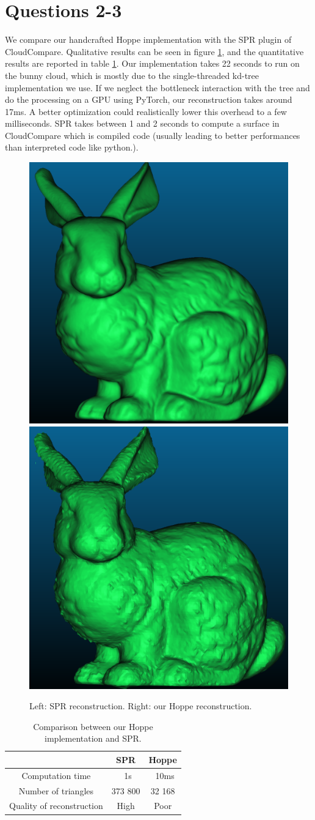 \documentclass[a4paper]{article}
\begin{document}
\section*{Questions 2-3}
We compare our handcrafted Hoppe implementation with the SPR plugin of CloudCompare.
Qualitative results can be seen in figure \ref{fig:hoppe_vs_spr}, and the quantitative results are 
reported in table \ref{tab:HoppeTable}. Our implementation takes 22 seconds to run
on the bunny cloud, which is mostly due to the single-threaded kd-tree implementation we use.
If we neglect the bottleneck interaction with the tree and do the processing on a GPU using PyTorch,
our reconstruction takes around 17ms. A better optimization could realistically lower this
overhead to a few milliseconds.
SPR takes between 1 and 2 seconds to compute a surface in CloudCompare
which is compiled code (usually leading to better performances than interpreted code like python.).

\begin{figure}[ht]
  \centering
  \includegraphics[width=0.3\linewidth]{figures/SPR.png}
  \includegraphics[width=0.3\linewidth]{figures/Hoppe.png}
  \caption{Left: SPR reconstruction. Right: our Hoppe reconstruction.}
  \label{fig:hoppe_vs_spr}
\end{figure}

\begin{table}
    \centering
    \begin{tabular}{|c|c|c|}
      \hline
         & SPR & Hoppe \\
      \hline
      Computation time & ~1s & ~10ms \\
      Number of triangles & 373 800 & 32 168  \\
      Quality of reconstruction & High & Poor \\
      \hline
    \end{tabular}
    \caption{Comparison between our Hoppe implementation and SPR.}
    \label{tab:HoppeTable}
  \end{table}
\end{document}
